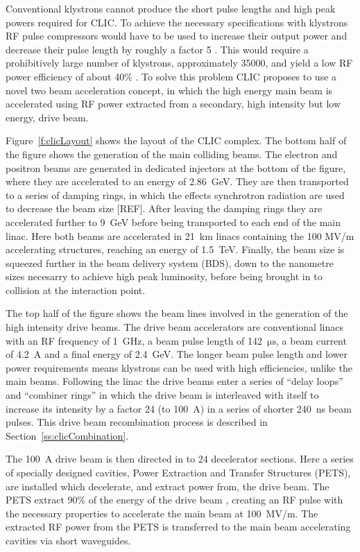 Conventional klystrons cannot produce the short pulse lengths and high peak powers required for CLIC. To achieve the necessary specifications with klystrons RF pulse compressors would have to be used to increase their output power and decrease their pulse length by roughly a factor 5 \cite{clicCDR}. This would require a prohibitively large number of klystrons, approximately 35000, and yield a low RF power efficiency of about 40\% \cite{clicCDR}. To solve this problem CLIC proposes to use a novel two beam acceleration concept, in which the high energy main beam is accelerated using RF power extracted from a secondary, high intensity but low energy, drive beam.

Figure~\ref{f:clicLayout} shows the layout of the CLIC complex. The bottom half of the figure shows the generation of the main colliding beams. The electron and positron beams are generated in dedicated injectors at the bottom of the figure, where they are accelerated to an energy of 2.86~GeV. They are then transported to a series of damping rings, in which the effects synchrotron radiation are used to decrease the beam size [REF]. After leaving the damping rings they are accelerated further to 9~GeV before being transported to each end of the main linac. Here both beams are accelerated in 21~km linacs containing the 100 MV/m accelerating structures, reaching an energy of 1.5~TeV. Finally, the beam size is squeezed further in the beam delivery system (BDS), down to the nanometre sizes necesarry to achieve high peak luminosity, before being brought in to collision at the interaction point.

The top half of the figure shows the beam lines involved in the generation of the high intensity drive beams. The drive beam accelerators are conventional linacs with an RF frequency of 1~GHz, a beam pulse length of 142~\(\mathrm{\mu s}\), a beam current of 4.2~A and a final energy of 2.4~GeV. The longer beam pulse length and lower power requirements means klystrons can be used with high efficiencies, unlike the main beams. Following the linac the drive beams enter a series of ``delay loops'' and ``combiner rings'' in which the drive beam is interleaved with itself to increase its intensity by a factor 24 (to 100~A) in a series of shorter 240~ns beam pulses. This drive beam recombination process is described in Section~\ref{ss:clicCombination}.

The 100~A drive beam is then directed in to 24 decelerator sections. Here a series of specially designed cavities, Power Extraction and Transfer Structures (PETS), are installed which decelerate, and extract power from, the drive beam. The PETS extract 90\% of the energy of the drive beam \cite{clicCDR}, creating an RF pulse with the necessary properties to accelerate the main beam at 100~MV/m. The extracted RF power from the PETS is transferred to the main beam accelerating cavities via short waveguides.




